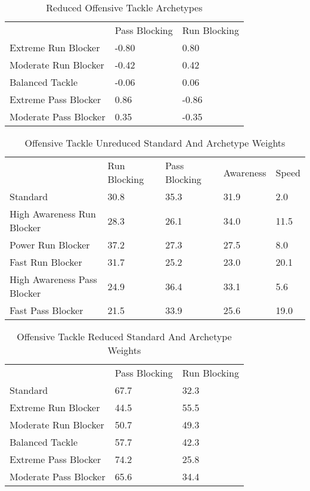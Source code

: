 \documentclass[11pt]{article}
\begin{document}
\begin{table}[]
\centering
\caption{Reduced Offensive Tackle Archetypes}
\label{ReducedOffensiveTackle}
\begin{tabular}{lll}
                      & Pass Blocking & Run Blocking \\
Extreme Run Blocker   & -0.80         & 0.80         \\
Moderate Run Blocker  & -0.42         & 0.42         \\
Balanced Tackle       & -0.06         & 0.06         \\
Extreme Pass Blocker  & 0.86          & -0.86        \\
Moderate Pass Blocker & 0.35          & -0.35       
\end{tabular}
\end{table}

\begin{table}[]
\centering
\caption{Offensive Tackle Unreduced Standard And Archetype Weights}
\label{OffensiveTackleUnreducedWeights}
\begin{tabular}{lllll}
                            & Run Blocking & Pass Blocking & Awareness & Speed \\
Standard                    & 30.8         & 35.3          & 31.9      & 2.0   \\
High Awareness Run Blocker  & 28.3         & 26.1          & 34.0      & 11.5  \\
Power Run Blocker           & 37.2         & 27.3          & 27.5      & 8.0   \\
Fast Run Blocker            & 31.7         & 25.2          & 23.0      & 20.1  \\
High Awareness Pass Blocker & 24.9         & 36.4          & 33.1      & 5.6   \\
Fast Pass Blocker           & 21.5         & 33.9          & 25.6      & 19.0 
\end{tabular}
\end{table}

\begin{table}[]
\centering
\caption{Offensive Tackle Reduced Standard And Archetype Weights}
\label{OffensiveTackleReducedWeights}
\begin{tabular}{lll}
                      & Pass Blocking & Run Blocking \\
Standard              & 67.7          & 32.3         \\
Extreme Run Blocker   & 44.5          & 55.5         \\
Moderate Run Blocker  & 50.7          & 49.3         \\
Balanced Tackle       & 57.7          & 42.3         \\
Extreme Pass Blocker  & 74.2          & 25.8         \\
Moderate Pass Blocker & 65.6          & 34.4        
\end{tabular}
\end{table}
\end{document}
